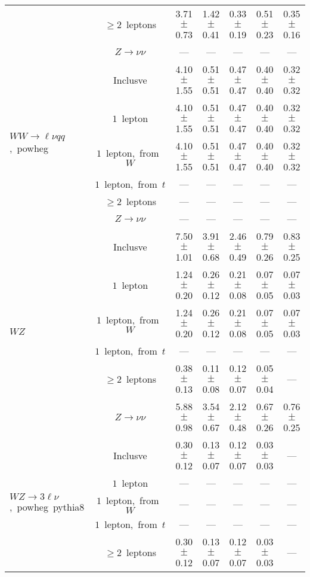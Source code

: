 \documentclass{article}
\begin{document}
\begin{longtable}{|l|c|c|c|c|c|c|}
 & $\ge2$~leptons  & 3.71 $\pm$ 0.73  & 1.42 $\pm$ 0.41  & 0.33 $\pm$ 0.19  & 0.51 $\pm$ 0.23  & 0.35 $\pm$ 0.16 \\* 
 & $Z\rightarrow\nu\nu$  & ---  & ---  & ---  & ---  & --- \\* 
\hline 
\multirow{6}{*}{$WW{\rightarrow}{\ell}{\nu}qq$,~powheg} & Inclusve  & 4.10 $\pm$ 1.55  & 0.51 $\pm$ 0.51  & 0.47 $\pm$ 0.47  & 0.40 $\pm$ 0.40  & 0.32 $\pm$ 0.32 \\* 
 & $1$~lepton  & 4.10 $\pm$ 1.55  & 0.51 $\pm$ 0.51  & 0.47 $\pm$ 0.47  & 0.40 $\pm$ 0.40  & 0.32 $\pm$ 0.32 \\* 
 & $1$~lepton,~from~$W$  & 4.10 $\pm$ 1.55  & 0.51 $\pm$ 0.51  & 0.47 $\pm$ 0.47  & 0.40 $\pm$ 0.40  & 0.32 $\pm$ 0.32 \\* 
 & $1$~lepton,~from~$t$  & ---  & ---  & ---  & ---  & --- \\* 
 & $\ge2$~leptons  & ---  & ---  & ---  & ---  & --- \\* 
 & $Z\rightarrow\nu\nu$  & ---  & ---  & ---  & ---  & --- \\* 
\hline 
\multirow{6}{*}{$WZ$} & Inclusve  & 7.50 $\pm$ 1.01  & 3.91 $\pm$ 0.68  & 2.46 $\pm$ 0.49  & 0.79 $\pm$ 0.26  & 0.83 $\pm$ 0.25 \\* 
 & $1$~lepton  & 1.24 $\pm$ 0.20  & 0.26 $\pm$ 0.12  & 0.21 $\pm$ 0.08  & 0.07 $\pm$ 0.05  & 0.07 $\pm$ 0.03 \\* 
 & $1$~lepton,~from~$W$  & 1.24 $\pm$ 0.20  & 0.26 $\pm$ 0.12  & 0.21 $\pm$ 0.08  & 0.07 $\pm$ 0.05  & 0.07 $\pm$ 0.03 \\* 
 & $1$~lepton,~from~$t$  & ---  & ---  & ---  & ---  & --- \\* 
 & $\ge2$~leptons  & 0.38 $\pm$ 0.13  & 0.11 $\pm$ 0.08  & 0.12 $\pm$ 0.07  & 0.05 $\pm$ 0.04  & --- \\* 
 & $Z\rightarrow\nu\nu$  & 5.88 $\pm$ 0.98  & 3.54 $\pm$ 0.67  & 2.12 $\pm$ 0.48  & 0.67 $\pm$ 0.26  & 0.76 $\pm$ 0.25 \\* 
\hline 
\multirow{6}{*}{$WZ{\rightarrow}3\ell\nu$,~powheg~pythia8} & Inclusve  & 0.30 $\pm$ 0.12  & 0.13 $\pm$ 0.07  & 0.12 $\pm$ 0.07  & 0.03 $\pm$ 0.03  & --- \\* 
 & $1$~lepton  & ---  & ---  & ---  & ---  & --- \\* 
 & $1$~lepton,~from~$W$  & ---  & ---  & ---  & ---  & --- \\* 
 & $1$~lepton,~from~$t$  & ---  & ---  & ---  & ---  & --- \\* 
 & $\ge2$~leptons  & 0.30 $\pm$ 0.12  & 0.13 $\pm$ 0.07  & 0.12 $\pm$ 0.07  & 0.03 $\pm$ 0.03  & --- \\* 

\end{longtable}
\end{document}
